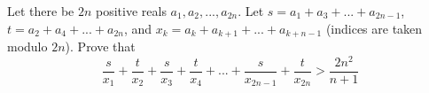 Let there be $2n$ positive reals $a_1,a_2,...,a_{2n}$. Let $s = a_1 + a_3 +...+ a_{2n-1}$, $t = a_2 + a_4 + ... + a_{2n}$, and
$x_k = a_k + a_{k+1} + ... + a_{k+n-1}$ (indices are taken modulo $2n$). Prove that
$$\frac{s}{x_1}+\frac{t}{x_2}+\frac{s}{x_3}+\frac{t}{x_4}+...+\frac{s}{x_{2n-1}}+\frac{t}{x_{2n}}>\frac{2n^2}{n+1}$$
